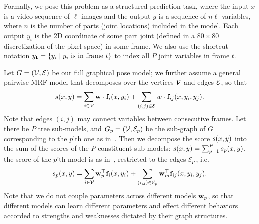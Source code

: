 Formally, we pose this problem as a structured prediction task, where
the input $x$ is a video sequence of $\ell$ images and the output $y$ is a
sequence of $n\ell$ variables, where $n$ is the number of parts (joint
locations) included in the model. Each output $y_i$ is the 2D
coordinate of some part joint (defined in a $80 \times 80$
discretization of the pixel space) in some frame.  We also use the shortcut notation 
$y_{\bf t} = \{ y_i \;|\; y_i \text{ is in frame } t \}$
to index all $P$ joint variables in frame $t$.  



Let $G = (\mathcal{V},\mathcal{E})$ be our full graphical
pose model; we further assume a general pairwise MRF model that decomposes over 
the vertices $\mathcal{V}$ and edges $\mathcal{E}$, so that
\begin{equation}
  \label{eq:loopy-model}
  s(x,y) = \sum_{i \in \mathcal{V}}\mathbf{w} \cdot \mathbf{f}_i(x,y_i) + \sum_{(i,j) \in \mathcal{E}}\\w \cdot 
\mathbf{f}_{ij}(x,y_i,y_j). 
\end{equation}
Note that edges $(i,j)$ may connect variables between consecutive
frames. Let there be $P$ tree sub-models, and $G_p = (\mathcal{V}, \mathcal{E}_p)$ be the sub-graph of $G$ corresponding
to the $p$'th one as in~.  Then
we decompose the score $s(x,y)$ into the sum of the scores of the
$P$ constituent sub-models: $s(x,y) = \sum_{p=1}^P s_p(x,y)$, the
score of the $p$'th model is as in~, restricted to the
edges $\mathcal{E}_p$, i.e. 
\begin{equation}
s_p(x,y) = \sum_{i\in\mathcal{V}}\mathbf{w}_p^\top\mathbf{f}_i(x,y_i) + 
\sum_{(i,j)\in\mathcal{E}_p}\mathbf{w}_m^\top\mathbf{f}_{ij}(x,y_i,y_j).
\end{equation}
Note that we do not couple parameters across different models $\mathbf{w}_p$, so that different models can learn different parameters and effect different behaviors accorded to strengths and weaknesses dictated by their graph structures.

